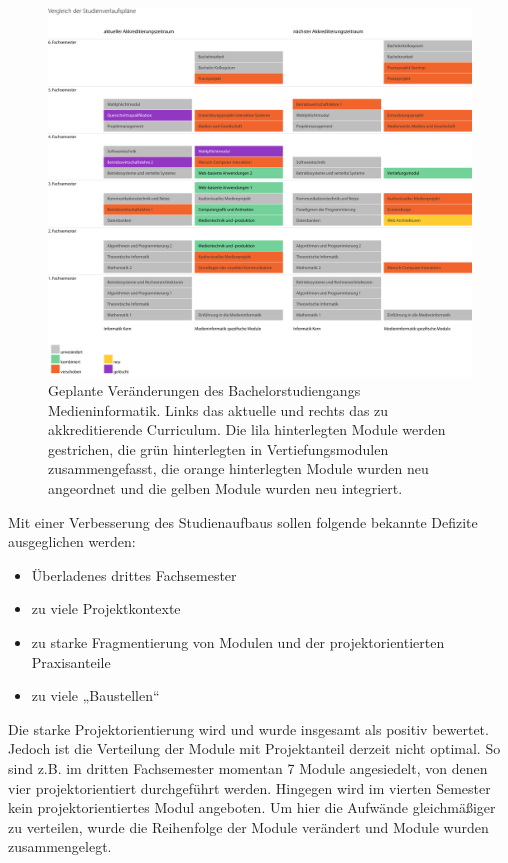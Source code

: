 \begin{figure}[htbp]
\centering
\includegraphics[width=\columnwidth]{../anhaenge/bilder/ba-veraenderungen-studienverlaufsplan.png}
\caption{Geplante Veränderungen des Bachelorstudiengangs
Medieninformatik. Links das aktuelle und rechts das zu akkreditierende
Curriculum. Die lila hinterlegten Module werden gestrichen, die grün
hinterlegten in Vertiefungsmodulen zusammengefasst, die orange
hinterlegten Module wurden neu angeordnet und die gelben Module wurden
neu integriert.}
\end{figure}

Mit einer Verbesserung des Studienaufbaus sollen folgende bekannte
Defizite ausgeglichen werden:

\begin{itemize}
\tightlist
\item
  Überladenes drittes Fachsemester
\item
  zu viele Projektkontexte
\item
  zu starke Fragmentierung von Modulen und der projektorientierten
  Praxisanteile
\item
  zu viele „Baustellen``
\end{itemize}

Die starke Projektorientierung wird und wurde insgesamt als positiv
bewertet. Jedoch ist die Verteilung der Module mit Projektanteil derzeit
nicht optimal. So sind z.B. im dritten Fachsemester momentan 7 Module
angesiedelt, von denen vier projektorientiert durchgeführt werden.
Hingegen wird im vierten Semester kein projektorientiertes Modul
angeboten. Um hier die Aufwände gleichmäßiger zu verteilen, wurde die
Reihenfolge der Module verändert und Module wurden zusammengelegt.

